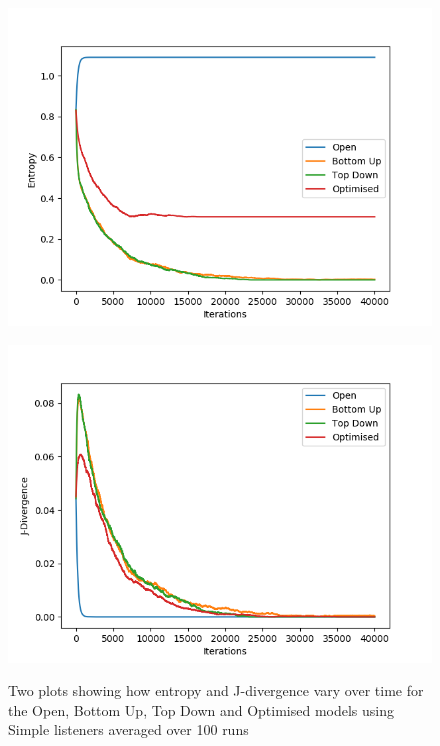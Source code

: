 \begin{figure}[H]
 \centering
  \begin{minipage}[ht]{0.49\textwidth}
    \includegraphics[width=\textwidth]{Images/Figures/All/Entropy_40000.png}
    \label{fig:entropy_all}
 \end{minipage}
 \hfill
 \begin{minipage}[ht]{0.49\textwidth}
    \includegraphics[width=\textwidth]{Images/Figures/All/J-Div_40000.png}
    \label{fig:J-div_all}
 \end{minipage}
 \caption{Two plots showing how entropy and J-divergence vary over time for the Open, Bottom Up, Top Down and Optimised models using Simple listeners averaged over 100 runs}
\end{figure}

